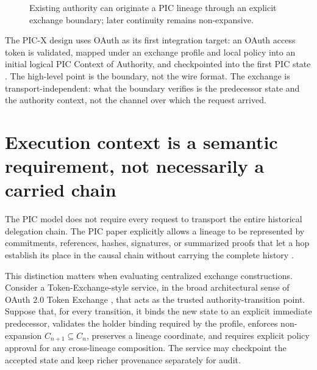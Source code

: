 \documentclass[10pt,oneside,openany]{book}
\begin{document}
\begin{figure}[ht]
\centering
{}
\caption{Existing authority can originate a PIC lineage through an explicit exchange boundary; later continuity remains non-expansive.}
\end{figure}

The PIC-X design uses OAuth as its first integration target: an OAuth access token is validated, mapped under an exchange profile and local policy into an initial logical PIC Context of Authority, and checkpointed into the first PIC state \cite{picxinitial}. The high-level point is the boundary, not the wire format. The exchange is transport-independent: what the boundary verifies is the predecessor state and the authority context, not the channel over which the request arrived.

\section{Execution context is a semantic requirement, not necessarily a carried chain}
The PIC model does not require every request to transport the entire historical delegation chain. The PIC paper explicitly allows a lineage to be represented by commitments, references, hashes, signatures, or summarized proofs that let a hop establish its place in the causal chain without carrying the complete history \cite{gallo2026pic}.

This distinction matters when evaluating centralized exchange constructions. Consider a Token-Exchange-style service, in the broad architectural sense of OAuth 2.0 Token Exchange \cite{rfc8693}, that acts as the trusted authority-transition point. Suppose that, for every transition, it binds the new state to an explicit immediate predecessor, validates the holder binding required by the profile, enforces non-expansion $C_{n+1}\subseteq C_n$, preserves a lineage coordinate, and requires explicit policy approval for any cross-lineage composition. The service may checkpoint the accepted state and keep richer provenance separately for audit.
\end{document}
